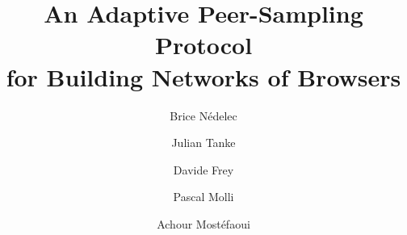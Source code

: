 \documentclass[sigconf]{acmart}
\begin{document}
\title{An Adaptive Peer-Sampling Protocol\\for Building Networks of Browsers}

\newcommand{\affLSNN}{L2SN, University of Nantes\\
  2 rue de la Houssini{\`e}re\\
  BP 92208, 44322 Nantes Cedex 3, France\\
  \url{first.last@univ-nantes.fr}}

\newcommand{\affINRIA}{INRIA Bretagne-Atlantique\\
  Campus Universitaire de Beaulieu \\
  35042 Rennes Cedex, France\\
  \url{davide.frey@inria.fr}}



\author{Brice N{\'e}delec}

\author{Julian Tanke}

\author{Davide Frey}

\author{Pascal Molli}

\author{Achour Most{\'e}faoui}






\maketitle
%


%
%
% 
% 
% 
% 
% 



\clearpage
  
\end{document}

